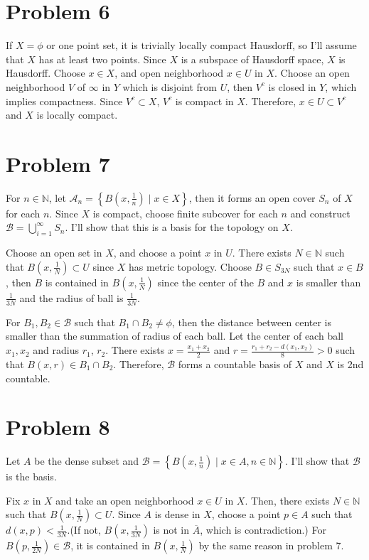 \documentclass{article}
\begin{document}
\section*{Problem 6}
If $X=\phi$ or one point set, it is trivially locally compact Hausdorff, so I'll assume that $X$ has at least two points. Since $X$ is a subspace of Hausdorff space, $X$ is Hausdorff. Choose $x\in X$, and open neighborhood $x\in U$ in $X$. Choose an open neighborhood $V$ of $\infty$ in $Y$ which is disjoint from $U$, then $V^c$ is closed in $Y$, which implies compactness. Since $V^c\subset X$, $V^c$ is compact in $X$. Therefore, $x\in U\subset V^c$ and $X$ is locally compact.
\section*{Problem 7}
For $n\in \mathbb{N}$, let $\mathcal{A}_n=\left\{B\left(x, \frac{1}{n}\right)\mid x\in X\right\}$, then it forms an open cover $S_n$ of $X$ for each $n$. Since $X$ is compact, choose finite subcover for each $n$ and construct $\mathcal{B}=\bigcup_{i=1}^\infty S_n$. I'll show that this is a basis for the topology on $X$.

Choose an open set in $X$, and choose a point $x$ in $U$. There exists $N\in \mathbb{N}$ such that $B\left(x, \frac{1}{N}\right)\subset U$ since $X$ has metric topology. Choose $B\in S_{3N}$ such that $x\in B$, then $B$ is contained in $B\left(x, \frac{1}{N}\right)$ since the center of the $B$ and $x$ is smaller than $\frac{1}{3N}$ and the radius of ball is $\frac{1}{3N}$.

For $B_1,B_2\in \mathcal{B}$ such that $B_1\cap B_2\neq \phi$, then the distance between center is smaller than the summation of radius of each ball. Let the center of each ball $x_1, x_2$ and radius $r_1$, $r_2$. There exists $x=\frac{x_1+x_2}{2}$ and $r=\frac{r_1+r_2-d(x_1,x_2)}{8}>0$ such that $B(x, r)\in B_1\cap B_2$. Therefore, $\mathcal{B}$ forms a countable basis of $X$ and $X$ is 2nd countable.
\section*{Problem 8}
Let $A$ be the dense subset and $\mathcal{B}=\left\{B\left(x, \frac{1}{n}\right)\mid x\in A,n\in \mathbb{N}\right\}$. I'll show that $\mathcal{B}$ is the basis.

Fix $x$ in $X$ and take an open neighborhood $x\in U$ in $X$. Then, there exists $N\in \mathbb{N}$ such that $B\left(x,\frac{1}{N}\right)\subset U$. Since $A$ is dense in $X$, choose a point $p\in A$ such that $d(x,p)<\frac{1}{3N}$.(If not, $B\left(x, \frac{1}{3N}\right)$ is not in $\overline{A}$, which is contradiction.) For $B\left(p, \frac{1}{2N}\right)\in \mathcal{B}$, it is contained in $B\left(x,\frac{1}{N}\right)$ by the same reason in problem 7.
\end{document}
